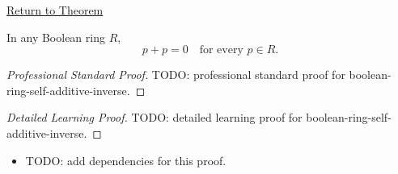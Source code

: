 \newpage
{}
\label{prf:boolean-ring-self-additive-inverse}

\begin{remark*}[Return]
\hyperref[prop:boolean-ring-self-additive-inverse]{Return to Theorem}
\end{remark*}

\begin{proposition*}
In any Boolean ring $R$,
\[
  p+p=0 \quad \text{for every } p\in R.
\]
\end{proposition*}

\begin{proof}[Professional Standard Proof]
\LRAProofBodyStart
TODO: professional standard proof for boolean-ring-self-additive-inverse.
\end{proof}

\begin{proof}[Detailed Learning Proof]
\LRAProofBodyStart
TODO: detailed learning proof for boolean-ring-self-additive-inverse.
\end{proof}

\begin{remark*}
\end{remark*}

\begin{dependencies}
\begin{itemize}
  \item TODO: add dependencies for this proof.
\end{itemize}
\end{dependencies}

\clearpage
